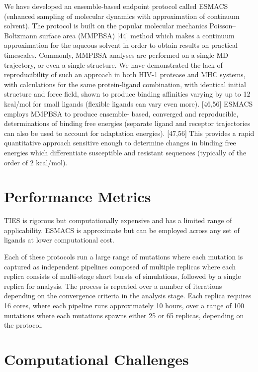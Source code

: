 \documentclass[conference]{IEEEtran}
\begin{document}
We have developed an ensemble-based endpoint protocol called ESMACS (enhanced sampling of molecular dynamics with approximation of continuum solvent). The protocol is built on the popular molecular mechanics Poisson–Boltzmann surface area (MMPBSA) [44] method which makes a continuum approximation for the aqueous solvent in order to obtain results on practical timescales. Commonly, MMPBSA analyses are performed on a single MD trajectory, or even a single structure. We have demonstrated the lack of reproducibility of such an approach in both HIV-1 protease and MHC systems, with calculations for the same protein-ligand combination, with identical initial structure and force field, shown to produce binding affinities varying by up to 12 kcal/mol for small ligands (flexible ligands can vary even more). [46,56] ESMACS employs MMPBSA to produce ensemble- based, converged and reproducible, determinations of binding free energies (separate ligand and receptor trajectories can also be used to account for adaptation energies). [47,56] This provides a rapid quantitative approach sensitive enough to determine changes in binding free energies which differentiate susceptible and resistant sequences (typically of the order of 2 kcal/mol).


\section{Performance Metrics}\label{sec:performance}

TIES is rigorous but computationally expensive and has a limited range of 
applicability. ESMACS is approximate but can be employed across any set of 
ligands at lower computational cost.

Each of these protocols run a large range of mutations where each 
mutation is captured as independent pipelines composed of multiple replicas 
where each replica consists of multi-stage short bursts 
of simulations, followed by a single replica for analysis. The process is 
repeated over a number of iterations depending on the convergence criteria 
in the analysis stage. Each replica requires 16 cores, where each pipeline 
runs approximately 10 hours, over a range of 100 mutations where each mutations 
spawns either 25 or 65 replicas, depending on the protocol.   


\section{Computational Challenges}\label{sec:cc}
\end{document}
